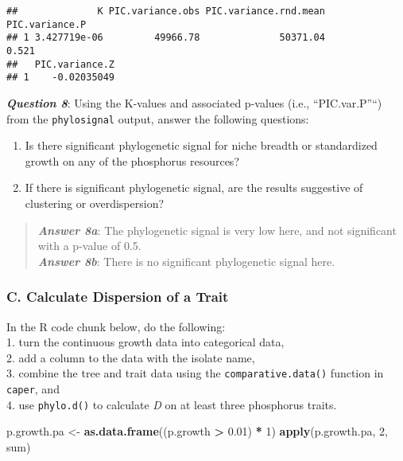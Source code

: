 \documentclass[]{article}
\newenvironment{Shaded}{\begin{snugshade}}{\end{snugshade}}
\newcommand{\KeywordTok}[1]{\textcolor[rgb]{0.13,0.29,0.53}{\textbf{#1}}}
\newcommand{\DecValTok}[1]{\textcolor[rgb]{0.00,0.00,0.81}{#1}}
\newcommand{\FloatTok}[1]{\textcolor[rgb]{0.00,0.00,0.81}{#1}}
\newcommand{\StringTok}[1]{\textcolor[rgb]{0.31,0.60,0.02}{#1}}
\newcommand{\OperatorTok}[1]{\textcolor[rgb]{0.81,0.36,0.00}{\textbf{#1}}}
\newcommand{\NormalTok}[1]{#1}
\providecommand{\tightlist}{%
  \setlength{\itemsep}{0pt}\setlength{\parskip}{0pt}}
\begin{document}
\begin{verbatim}
##              K PIC.variance.obs PIC.variance.rnd.mean PIC.variance.P
## 1 3.427719e-06         49966.78              50371.04          0.521
##   PIC.variance.Z
## 1    -0.02035049
\end{verbatim}

\textbf{\emph{Question 8}}: Using the K-values and associated p-values
(i.e., ``PIC.var.P''``) from the \texttt{phylosignal} output, answer the
following questions:

\begin{enumerate}
\def\labelenumi{\alph{enumi}.}
\tightlist
\item
  Is there significant phylogenetic signal for niche breadth or
  standardized growth on any of the phosphorus resources?\\
\item
  If there is significant phylogenetic signal, are the results
  suggestive of clustering or overdispersion?
\end{enumerate}

\begin{quote}
\textbf{\emph{Answer 8a}}: The phylogenetic signal is very low here, and
not significant with a p-value of 0.5.\\
\textbf{\emph{Answer 8b}}: There is no significant phylogenetic signal
here.
\end{quote}

\subsubsection{C. Calculate Dispersion of a
Trait}\label{c.-calculate-dispersion-of-a-trait}

In the R code chunk below, do the following:\\
1. turn the continuous growth data into categorical data,\\
2. add a column to the data with the isolate name,\\
3. combine the tree and trait data using the \texttt{comparative.data()}
function in \texttt{caper}, and\\
4. use \texttt{phylo.d()} to calculate \emph{D} on at least three
phosphorus traits.

\begin{Shaded}
\begin{Highlighting}[]
\NormalTok{p.growth.pa <-}\StringTok{ }\KeywordTok{as.data.frame}\NormalTok{((p.growth }\OperatorTok{>}\StringTok{ }\FloatTok{0.01}\NormalTok{) }\OperatorTok{*}\StringTok{ }\DecValTok{1}\NormalTok{)}
\KeywordTok{apply}\NormalTok{(p.growth.pa, }\DecValTok{2}\NormalTok{, sum)}
\end{Highlighting}
\end{Shaded}
\end{document}
